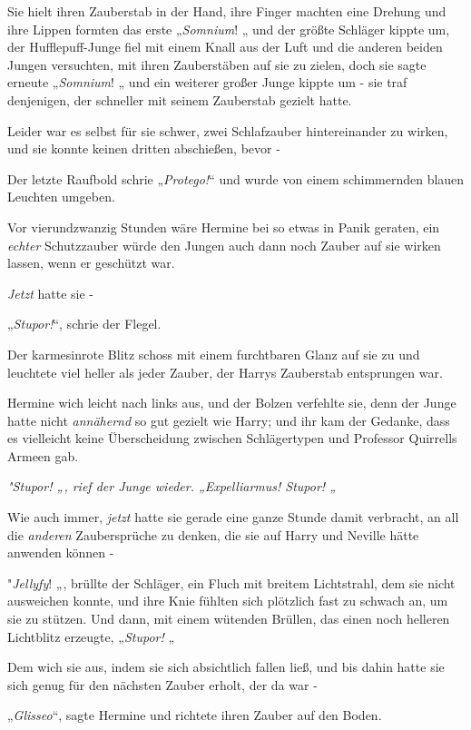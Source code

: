 {Sie hielt ihren Zauberstab in der Hand, ihre Finger machten eine Drehung und ihre Lippen formten das erste „\emph{Somnium}! „ und der größte Schläger kippte um, der Hufflepuff-Junge fiel mit einem Knall aus der Luft und die anderen beiden Jungen versuchten, mit ihren Zauberstäben auf sie zu zielen, doch sie sagte erneute „\emph{Somnium}! „ und ein weiterer großer Junge kippte um - sie traf denjenigen, der schneller mit seinem Zauberstab gezielt hatte.

Leider war es selbst für sie schwer, zwei Schlafzauber hintereinander zu wirken, und sie konnte keinen dritten abschießen, bevor -

Der letzte Raufbold schrie „\emph{Protego!}“ und wurde von einem schimmernden blauen Leuchten umgeben.

Vor vierundzwanzig Stunden wäre Hermine bei so etwas in Panik geraten, ein \emph{echter} Schutzzauber würde den Jungen auch dann noch Zauber auf sie wirken lassen, wenn er geschützt war.

\emph{Jetzt} hatte sie -

„\emph{Stupor!}“, schrie der Flegel.

Der karmesinrote Blitz schoss mit einem furchtbaren Glanz auf sie zu und leuchtete viel heller als jeder Zauber, der Harrys Zauberstab entsprungen war.

Hermine wich leicht nach links aus, und der Bolzen verfehlte sie, denn der Junge hatte nicht \emph{annähernd} so gut gezielt wie Harry; und ihr kam der Gedanke, dass es vielleicht keine Überscheidung zwischen Schlägertypen und Professor Quirrells Armeen gab.

\emph{\emph{"Stupor! „}, rief der Junge wieder. \emph{„Expelliarmus! Stupor! „}}

Wie auch immer, \emph{jetzt} hatte sie gerade eine ganze Stunde damit verbracht, an all die \emph{anderen} Zaubersprüche zu denken, die sie auf Harry und Neville hätte anwenden können -

"\emph{Jellyfy}! „, brüllte der Schläger, ein Fluch mit breitem Lichtstrahl, dem sie nicht ausweichen konnte, und ihre Knie fühlten sich plötzlich fast zu schwach an, um sie zu stützen. Und dann, mit einem wütenden Brüllen, das einen noch helleren Lichtblitz erzeugte, „\emph{Stupor!} „

Dem wich sie aus, indem sie sich absichtlich fallen ließ, und bis dahin hatte sie sich genug für den nächsten Zauber erholt, der da war -

„\emph{Glisseo}“, sagte Hermine und richtete ihren Zauber auf den Boden.

}
